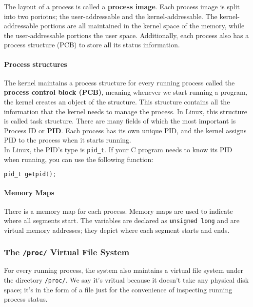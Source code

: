 \documentclass{article}
\newcommand{\bold}[1]{\textbf{#1}}
\newcommand{\code}[1]{\texttt{#1}}
\begin{document}
The layout of a process is called a \bold{process image}. Each process image is split into two poriotns; the user-addressable and the kernel-addressable. The kernel-addressable portions are all maintained in the kernel space of the memory, while the user-addressable portions the user space. Additionally, each process also has a process structure (PCB) to store all its status information. 

\paragraph{Process structures}

The kernel maintains a process structure for every running process called the \bold{process control block (PCB)}, meaning whenever we start running a program, the kernel creates an object of the structure. This structure contains all the information that the kernel needs to manage the process. In Linux, this structure is called task structure. There are many fields of which the most important is Process ID or \bold{PID}. Each process has its own unique PID, and the kernel assigns PID to the process when it starts running. \\

In Linux, the PID's type is \code{pid\_t}. If your C program needs to know its PID when running, you can use the following function: 

\begin{lstlisting}[language=C]
pid_t getpid();
\end{lstlisting}

\paragraph{Memory Maps}

There is a memory map for each process. Memory maps are used to indicate where all segments start. The variables are declared as \code{unsigned long} and are virtual memory addresses; they depict where each segment starts and ends. 

\subsubsection{The \code{/proc/} Virtual File System}

For every running process, the system also maintains a virtual file system under the directory \code{/proc/}. We say it's vritual because it doesn't take any physical disk space; it's in the form of a file just for the convenience of inspecting running process status. 
\end{document}
